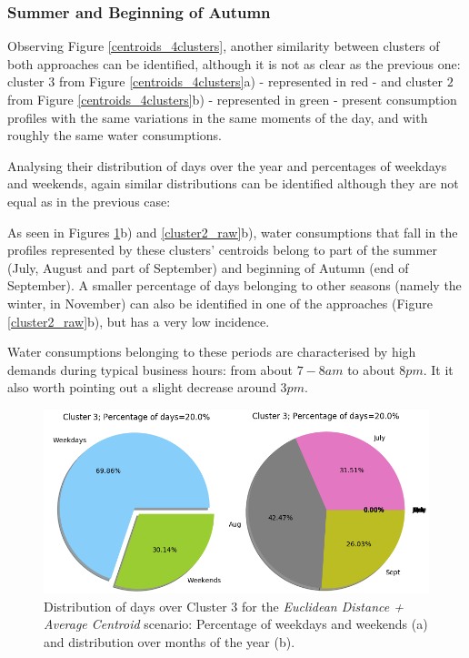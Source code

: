 \documentclass[9pt,journal,compsoc]{IEEEtran}
\begin{document}
\subsubsection{Summer and Beginning of Autumn}

Observing Figure \ref{centroids_4clusters}, another similarity between clusters of both approaches can be identified, although it is not as clear as the previous one: cluster $3$ from Figure \ref{centroids_4clusters}a) - represented in red - and cluster $2$ from Figure \ref{centroids_4clusters}b) - represented in green - present consumption profiles with the same variations in the same moments of the day, and with roughly the same water consumptions.

Analysing their distribution of days over the year and percentages of weekdays and weekends, again similar distributions can be identified although they are not equal as in the previous case:

As seen in Figures \ref{cluster3_euclidean}b) and \ref{cluster2_raw}b), water consumptions that fall in the profiles represented by these clusters' centroids belong to part of the summer (July, August and part of September) and beginning of Autumn (end of September). A smaller percentage of days belonging to other seasons (namely the winter, in November) can also be identified in one of the approaches (Figure \ref{cluster2_raw}b), but has a very low incidence.

Water consumptions belonging to these periods are characterised by high demands during typical business hours: from about $7-8am$ to about $8pm$. It it also worth pointing out a slight decrease around $3pm$.

\begin{figure}
	\centering
	\includegraphics[scale=0.4]{images/percent_week__months_euc_average_cluster3_k4.png}
	\caption{Distribution of days over Cluster $3$ for the \emph{Euclidean Distance + Average Centroid} scenario: Percentage of weekdays and weekends (a) and distribution over months of the year (b).}
	\label{cluster3_euclidean}
\end{figure}
\end{document}
